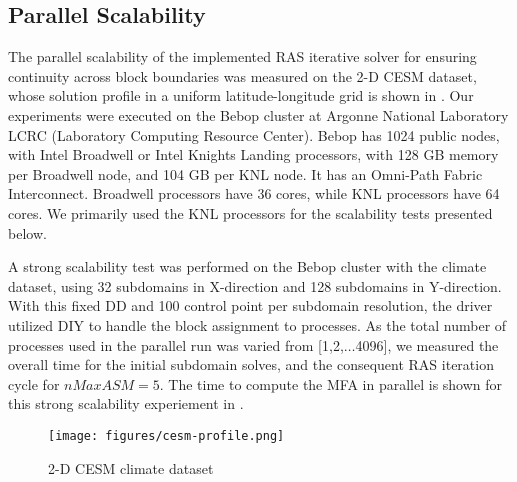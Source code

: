 

%



\subsection{Parallel Scalability}\label{sec:parallel-scalability}

The parallel scalability of the implemented RAS iterative solver for ensuring continuity across block boundaries was measured on the 2-D CESM dataset, whose solution profile in a uniform latitude-longitude grid is shown in . 
Our experiments were executed on the Bebop cluster at
Argonne National Laboratory LCRC (Laboratory Computing Resource Center). Bebop has 1024 public nodes, with Intel Broadwell or Intel Knights Landing processors, with 128 GB memory per Broadwell node, and 104 GB per KNL node. It has an Omni-Path Fabric Interconnect. Broadwell processors have 36 cores, while KNL processors have 64 cores. We primarily used the KNL processors for the scalability tests presented below.

A strong scalability test was performed on the Bebop cluster with the climate dataset, using 32 subdomains in X-direction and 128 subdomains in Y-direction. With this fixed DD and 100 control point per subdomain resolution, the driver utilized DIY to handle the block assignment to processes. As the total number of processes used in the parallel run was varied from [1,2,$\ldots$4096], we measured the overall time for the initial subdomain solves, and the consequent RAS iteration cycle for $nMaxASM=5$. The time to compute the MFA in parallel is shown for this strong scalability experiement in .

\begin{figure}
	\texttt{[image: figures/cesm-profile.png]}
	\caption{2-D CESM climate dataset}
	\label{fig:cesm-2d-profile]}
\end{figure}

